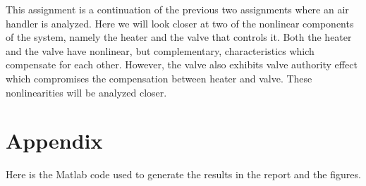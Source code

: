 \documentclass[a4paper, titlepage]{article}
\begin{document}
This assignment is a continuation of the previous two assignments where an air handler is analyzed.
Here we will look closer at two of the nonlinear components of the system, namely the heater and the valve that controls it.
Both the heater and the valve have nonlinear, but complementary, characteristics which compensate for each other.  However, the valve also exhibits valve authority effect which compromises the compensation between heater and valve.  These nonlinearities will be analyzed closer. 
\citep[p.123]{glad00}

   


\clearpage


\clearpage
\appendix

\section{Appendix}
Here is the Matlab code used to generate the results in the report and the figures.



\end{document}
